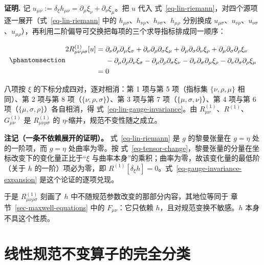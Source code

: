 \documentclass[
  chinese,
  a4paper,
  UTF8,
  12pt,
  oneside,
  openany]{ctexbook}
\theoremstyle{plain}
\theoremstyle{plain}
\theoremstyle{plain}
\theoremstyle{definition}
\theoremstyle{plain}
\theoremstyle{plain}
\theoremstyle{remark}
\begin{document}
\textbf{证明.} 记
\(u_{\mu\nu}:=\delta_{\xi}h_{\mu\nu}=\partial_{\mu}\xi_{\nu}+\partial_{\nu}\xi_{\mu}\)。把
\(u\) 代入
式~\ref{eq-lin-riemann}，对四个源项逐一展开（式~\ref{eq-lin-riemann}
中的
\(h_{\mu\sigma}\)、\(h_{\nu\rho}\)、\(h_{\nu\sigma}\)、\(h_{\mu\rho}\)
分别换成
\(u_{\mu\sigma}\)、\(u_{\nu\rho}\)、\(u_{\nu\sigma}\)、\(u_{\mu\rho}\)），再利用二阶偏导可交换把每项的三个求导指标排成同一顺序：

\begin{equation}\protect\phantomsection\label{eq-gauge-invariance-expansion}{
\begin{aligned}
2R^{(1)}_{\mu\nu\rho\sigma}[u]
={}&\partial_{\nu}\partial_{\rho}\partial_{\mu}\xi_{\sigma}
+\partial_{\nu}\partial_{\rho}\partial_{\sigma}\xi_{\mu}
+\partial_{\mu}\partial_{\sigma}\partial_{\nu}\xi_{\rho}
+\partial_{\mu}\partial_{\sigma}\partial_{\rho}\xi_{\nu}\\
&-\partial_{\mu}\partial_{\rho}\partial_{\nu}\xi_{\sigma}
-\partial_{\mu}\partial_{\rho}\partial_{\sigma}\xi_{\nu}
-\partial_{\nu}\partial_{\sigma}\partial_{\mu}\xi_{\rho}
-\partial_{\nu}\partial_{\sigma}\partial_{\rho}\xi_{\mu}\\
={}&0
\end{aligned}
}\end{equation}

八项按 \(\xi\) 的下标分成四对，逐对相消：第 1 项与第 5 项（指标集
\(\{\nu,\rho,\mu\}\) 相同）、第 2 项与第 8
项（\(\{\nu,\rho,\sigma\}\)）、第 3 项与第 7
项（\(\{\mu,\sigma,\nu\}\)）、第 4 项与第 6
项（\(\{\mu,\sigma,\rho\}\)）各自相消，得
式~\ref{eq-lin-gauge-invariance}。由
\(R^{(1)}_{\mu\nu}\)、\(R^{(1)}\)、\(G^{(1)}_{\mu\nu}\) 是
\(R^{(1)}_{\mu\nu\rho\sigma}\) 的 \(\eta\)-缩并，规范不变性随之成立。

\textbf{注记（一条不依赖展开的证明）。} 式~\ref{eq-lin-riemann} 是 \(g\)
的黎曼张量在 \(g=\eta\) 处的一阶项，而 \(g=\eta\) 处曲率为零。按
式~\ref{eq-tensor-change}，黎曼张量的分量在坐标改变下的变化量正比于``\(\xi\)
与曲率本身''的乘积；曲率为零，故该变化量的最低阶（关于 \(h\)
的一阶）项必为零，即
\(R^{(1)}[\delta_{\xi}h]=0\)。式~\ref{eq-gauge-invariance-expansion}
是这个论证的逐项兑现。

于是 \(R^{(1)}_{\mu\nu\rho\sigma}\) 刻画了 \(h\)
中不随规范参数改变的那部分内容，其地位等同于
章节~\ref{sec-maxwell-equations} 中的 \(F_{\mu\nu}\)：它只依赖
\(h\)，且对规范变换不敏感。\(h\) 本身不具这个性质。

\section{线性规范不变算子的完全分类}\label{sec-fsg-linear}
\end{document}

